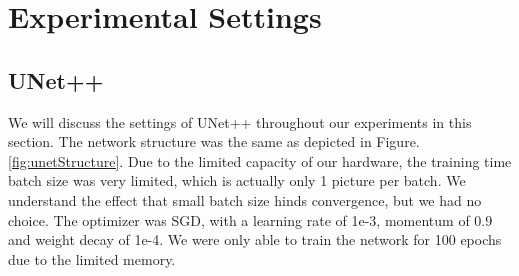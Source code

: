 \section{Experimental Settings}
\subsection{UNet++}
We will discuss the settings of UNet++ throughout our experiments in this section. The network structure was the same as depicted in Figure.\ref{fig:unetStructure}. Due to the limited capacity of our hardware, the training time batch size was very limited, which is actually only 1 picture per batch. We understand the effect that small batch size hinds convergence, but we had no choice. The optimizer was SGD, with a learning rate of 1e-3, momentum of 0.9 and weight decay of 1e-4. We were only able to train the network for 100 epochs due to the limited memory.

